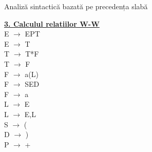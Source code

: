 \documentclass[pdf]{beamer}
\begin{document}
\begin{frame}{Analiză sintactică bazată pe precedența slabă}
\tiny
\begin{minipage}{0.30\textwidth}
    \color{red}\underline{\textbf{3. Calculul relatiilor W-W}}\\
    \color{black}
    E $\rightarrow$ EPT\\
    E $\rightarrow$ T\\
    T $\rightarrow$ T*F\\
    T $\rightarrow$ F\\
    F $\rightarrow$ a(L)\\
    F $\rightarrow$ SED\\
    F $\rightarrow$ a\\
    L $\rightarrow$ E\\
    L $\rightarrow$ E,L\\
    S $\rightarrow$ (\\
    D $\rightarrow$ )\\
    P $\rightarrow$ +\\
    
\end{minipage}%
\hfill
\begin{minipage}{0.65\textwidth}
\setlength{\tabcolsep}{10pt}
\begin{tabular}{p{3cm} p{3cm}}
\tiny
    &\\
    \hline
    \hline


\end{tabular}
\end{minipage}
\end{frame}
\end{document}
